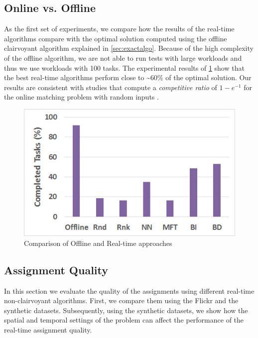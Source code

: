 \subsection{Online vs. Offline}
As the first set of experiments, we compare how the results of the real-time algorithms compare with the optimal solution computed using the offline clairvoyant algorithm explained in \cref{sec:exactalgo}. Because of the high complexity of the offline algorithm, we are not able to run tests with large workloads and thus we use workloads with 100 tasks. The experimental results of \cref{fig:off_vs_on} show that the best real-time algorithms perform close to \textasciitilde 60\% of the optimal solution. Our results are consistent with studies that compute a \emph{competitive ratio} \cite{Sleator85} of $1 - e^{-1}$ for the online matching problem with random inputs \cite{Goel08}.

\begin{figure}[h]
	\centering
	\includegraphics[width = 0.6\columnwidth]{figures/off_vs_on.jpg}
	\caption{Comparison of Offline and Real-time approaches}\label{fig:off_vs_on}
\end{figure}

\subsection{Assignment Quality}
In this section we evaluate the quality of the assignments using different real-time non-clairvoyant algorithms. First, we compare them using the Flickr and the synthetic datasets. Subsequently, using the synthetic datasets, we show how the spatial and temporal settings of the problem can affect the performance of the real-time assignment quality.

